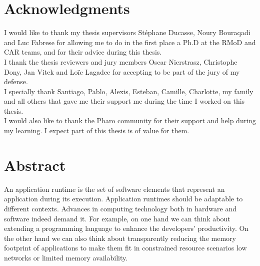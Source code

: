 \documentclass[a4paper,11pt,twoside]{include/ThesisStyle}
\begin{document}


\dominitoc

\cleardoublepage
\chapter*{Acknowledgments}

I would like to thank my thesis supervisors Stéphane Ducasse, Noury Bouraqadi and Luc Fabrese for allowing me to do in the first place a Ph.D at the RMoD and CAR teams, and for their advice during this thesis.\\

\noindent I thank the thesis reviewers and jury members Oscar Nierstrasz, Christophe Dony, Jan Vitek and Loïc Lagadec for accepting to be part of the jury of my defense.\\%


\noindent I specially thank Santiago, Pablo, Alexis, Esteban, Camille, Charlotte, my family and all others that gave me their support me during the time I worked on this thesis.\\

\noindent I would also like to thank the Pharo community for their support and help during my learning. I expect part of this thesis is of value for them.\\



\chapter*{Abstract}

An application runtime is the set of software elements that represent an application during its execution. Application runtimes should be adaptable to different contexts. Advances in computing technology both in hardware and software indeed demand it. For example, on one hand we can think about extending a programming language to enhance the developers' productivity. On the other hand we can also think about transparently reducing the memory footprint of applications to make them fit in constrained resource scenarios \eg low networks or limited memory availability.
\end{document}
